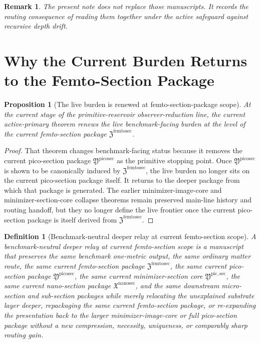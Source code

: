\documentclass[11pt]{article}
\newcommand{\NanoSectionPackage}{\mathfrak X^{\mathrm{nanosec}}}
\newcommand{\PicoSectionPackage}{\mathfrak Y^{\mathrm{picosec}}}
\newcommand{\PicoMinSectionCore}{\mathfrak Y^{\mathrm{pic,sec}}}
\newcommand{\FemtoSectionPackage}{\mathfrak Z^{\mathrm{femtosec}}}
\newtheorem{definition}{Definition}
\newtheorem{proposition}{Proposition}
\newtheorem{remark}{Remark}
\begin{document}
\begin{remark}
The present note does not replace those manuscripts. It records the routing consequence of reading them together under the active safeguard against recursive depth drift.
\end{remark}

\section{Why the Current Burden Returns to the Femto-Section Package}

\begin{proposition}[The live burden is renewed at femto-section-package scope]
At the current stage of the primitive-reservoir observer-reduction line, the current active-primary theorem renews the live benchmark-facing burden at the level of the current femto-section package \(\FemtoSectionPackage\).
\end{proposition}

\begin{proof}
That theorem changes benchmark-facing status because it removes the current pico-section package \(\PicoSectionPackage\) as the primitive stopping point. Once \(\PicoSectionPackage\) is shown to be canonically induced by \(\FemtoSectionPackage\), the live burden no longer sits on the current pico-section package itself. It returns to the deeper package from which that package is generated. The earlier minimizer-image-core and minimizer-section-core collapse theorems remain preserved main-line history and routing handoff, but they no longer define the live frontier once the current pico-section package is itself derived from \(\FemtoSectionPackage\).
\end{proof}

\begin{definition}[Benchmark-neutral deeper relay at current femto-section scope]
A \emph{benchmark-neutral deeper relay at current femto-section scope} is a manuscript that preserves the same benchmark one-metric output, the same ordinary matter route, the same current femto-section package \(\FemtoSectionPackage\), the same current pico-section package \(\PicoSectionPackage\), the same current minimizer-section core \(\PicoMinSectionCore\), the same current nano-section package \(\NanoSectionPackage\), and the same downstream micro-section and sub-section packages while merely relocating the unexplained substrate layer deeper, repackaging the same current femto-section package, or re-expanding the presentation back to the larger minimizer-image-core or full pico-section package without a new compression, necessity, uniqueness, or comparably sharp routing gain.
\end{definition}
\end{document}
